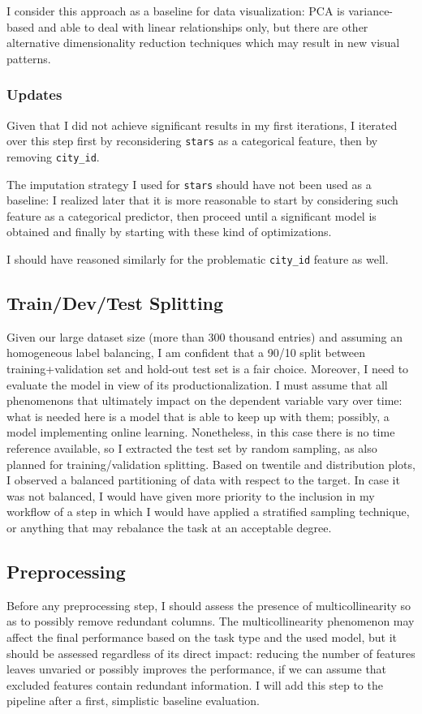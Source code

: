\documentclass[preprint,12pt,3p]{elsarticle}
\begin{document}
I consider this approach as a baseline for data visualization: PCA is variance-based and able to deal with linear relationships only, but there are other alternative dimensionality reduction techniques which may result in new visual patterns.

\subsubsection{Updates}
Given that I did not achieve significant results in my first iterations, I iterated over this step first by reconsidering \verb|stars| as a categorical feature, then by removing \verb|city_id|.

The imputation strategy I used for \verb|stars| should have not been used as a baseline: I realized later that it is more reasonable to start by considering such feature as a categorical predictor, then proceed until a significant model is obtained and finally by starting with these kind of optimizations.

I should have reasoned similarly for the problematic \verb|city_id| feature as well.
 
\subsection{Train/Dev/Test Splitting}
Given our large dataset size (more than 300 thousand entries) and assuming an homogeneous label balancing, I am confident that a 90/10 split between training+validation set and hold-out test set is a fair choice. Moreover, I need to evaluate the model in view of its productionalization. I must assume that all phenomenons that ultimately impact on the dependent variable vary over time: what is needed here is a model that is able to keep up with them; possibly, a model implementing online learning. Nonetheless, in this case there is no time reference available, so I extracted the test set by random sampling, as also planned for training/validation splitting.
Based on twentile and distribution plots, I observed a balanced partitioning of data with respect to the target. In case it was not balanced, I would have given more priority to the inclusion in my workflow of a step in which I would have applied a stratified sampling technique, or anything that may rebalance the task at an acceptable degree.

\subsection{Preprocessing}
Before any preprocessing step, I should assess the presence of multicollinearity so as to possibly remove redundant columns. The multicollinearity phenomenon may affect the final performance based on the task type and the used model, but it should be assessed regardless of its direct impact: reducing the number of features leaves unvaried or possibly improves the performance, if we can assume that excluded features contain redundant information. I will add this step to the pipeline after a first, simplistic baseline evaluation.
\end{document}
